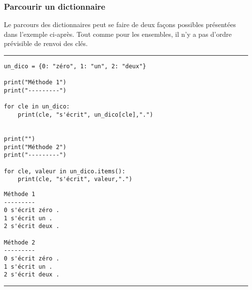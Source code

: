 \subsubsection{Parcourir un dictionnaire}

Le parcours des dictionnaires peut se faire de deux façons possibles présentées dans l'exemple ci-après. Tout comme pour les ensembles, il n'y a pas d'ordre prévisible de renvoi des clés.


\bigskip
{\hrule height .5mm}
\begin{verbatim}
un_dico = {0: "zéro", 1: "un", 2: "deux"}

print("Méthode 1")
print("---------")

for cle in un_dico:
    print(cle, "s'écrit", un_dico[cle],".")


print("")
print("Méthode 2")
print("---------")

for cle, valeur in un_dico.items():
    print(cle, "s'écrit", valeur,".")
\end{verbatim}
 \color{ForestGreen}
\vspace{-1.5em}
\begin{verbatim}
Méthode 1
---------
0 s'écrit zéro .
1 s'écrit un .
2 s'écrit deux .

Méthode 2
---------
0 s'écrit zéro .
1 s'écrit un .
2 s'écrit deux .
\end{verbatim} \color{Black}
{\hrule height .5mm}
\bigskip